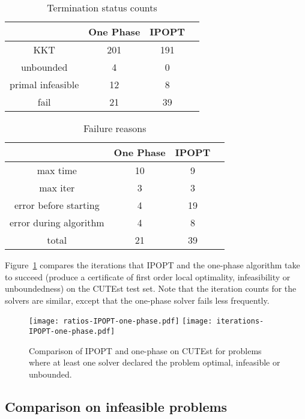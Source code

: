 \documentclass{article}
\begin{document}

\begin{table}[H]
\caption{Termination status counts}\label{tbl:termination-status-counts}
\begin{tabular}{ c c c r }
 &  One Phase &  IPOPT &  \\
  \hline
KKT &  201 & 191 \\
unbounded & 4 & 0  \\
primal infeasible & 12 &  8 \\
fail & 21 & 39 \\
\end{tabular}
\end{table}

\begin{table}[H]
\caption{Failure reasons}\label{tbl:failure-reasons}
\begin{tabular}{ c c c r }
 &  One Phase & IPOPT \\
  \hline
max time & 10 & 9  \\
max iter &  3 & 3 \\
error before starting & 4 & 19 \\
error during algorithm & 4 & 8 \\
\hline
total & 21 & 39
\end{tabular}
\end{table}

Figure~\ref{fig:comparison-IPOPT-on-CUTEst} compares the iterations that IPOPT and the one-phase algorithm take to succeed (produce a certificate of first order local optimality, infeasibility or unboundedness) on the CUTEst test set. Note that the iteration counts for the solvers are similar, except that the one-phase solver fails less frequently.


\begin{figure}[H]
\texttt{[image: ratios-IPOPT-one-phase.pdf]}
\texttt{[image: iterations-IPOPT-one-phase.pdf]}
\caption{Comparison of IPOPT and one-phase on CUTEst for problems where at least one solver declared the problem optimal, infeasible or unbounded.}\label{fig:comparison-IPOPT-on-CUTEst}
\end{figure}


\subsection{Comparison on infeasible problems}\label{sec:infeas}
\end{document}
